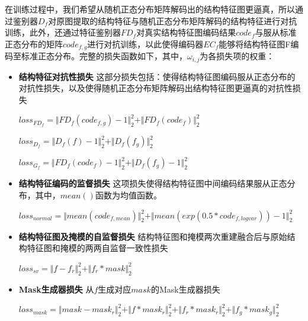 \documentclass[letterpaper]{article} %
\begin{document}
在训练过程中，我们希望从随机正态分布矩阵解码出的结构特征图更逼真，所以通过鉴别器$D_f$对原图提取的结构特征与随机正态分布矩阵解码的结构特征进行对抗训练，此外，还通过特征鉴别器$FD_f$对真实结构特征图编码结果$code_f$与服从标准正态分布的矩阵$code_{f,g}$进行对抗训练，以此使得编码器$EC_f$能够将结构特征图F编码至标准正态分布。完整的损失函数如下，其中，$\omega_{i,j}$为各损失项的权重：
\begin{itemize}
	\item\textbf{结构特征对抗性损失} 
	这部分损失包括：使得结构特征图编码服从正态分布的对抗性损失，以及使得随机正态分布矩阵解码出结构特征图更逼真的对抗性损失

\begin{center}
	$loss_{FD_f}=\Vert{FD_f(code_{f,g})-1}\Vert_{2}^{2}+\Vert{FD_f(code_f)}\Vert_{2}^{2}$
\end{center}

\begin{center}
	$loss_{D_f}=\Vert{D_f(f)-1}\Vert_{2}^{2}+\Vert{D_f(f_g )}\Vert_{2}^{2}$
\end{center}

\begin{center}
	$loss_{G_f}=\Vert{FD_f(code_f)-1}\Vert_{2}^{2}+\Vert{D_f(f_g)-1}\Vert_{2}^{2}$
\end{center}

	\item \textbf{结构特征编码的监督损失} 
	这项损失使得结构特征图中间编码结果服从正态分布，其中，$mean()$函数为均值函数。

\begin{center}
	$loss_{normal}=\Vert{mean(code_{f,mean})}\Vert_{2}^{2}+ \Vert{mean(exp(0.5*code_{f,logvar}))-1}\Vert_{2}^{2}$
\end{center}

	\item \textbf{结构特征图及掩模的自监督损失} 
	结构特征图和掩模两次重建融合后与原始结构特征图和掩模的两两自监督一致性损失

\begin{center}
	$loss_{sv}=\Vert{f-f_r}\Vert_{2}^{2}+\Vert{f_r*mask}\Vert_{2}^{2}$
\end{center}

	\item \textbf{Mask生成器损失}
	从$f$生成对应$mask$的Mask生成器损失
\begin{center}
	$loss_{mask}=\Vert{mask-mask_r }\Vert_{2}^{2}+\Vert{f*mask_r}\Vert_{2}^{2}+\Vert{f_r*mask_r}\Vert_{2}^{2}+\Vert{f_g*mask_g}\Vert_{2}^{2}$
\end{center}
\end{itemize}
\end{document}
